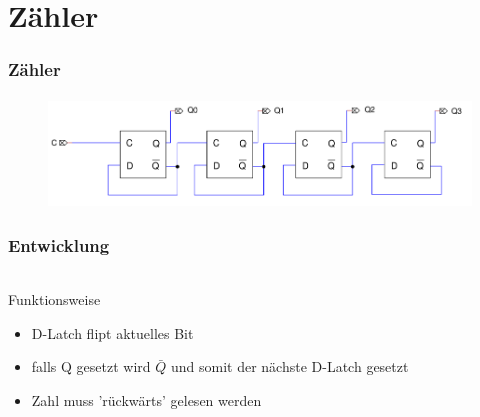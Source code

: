 \section{Zähler} %
\label{sec:Zähler}
\begin{frame}
    \frametitle{Zähler}
    \framesubtitle{}
     \begin{figure}[H]
     \begin{center}
             \includegraphics[scale=0.3]{./img/schaltung/zahler.png}
     \end{center}
     \end{figure}
\end{frame}
\begin{frame}
    \frametitle{Entwicklung}
    \framesubtitle{}
    \begin{columns}[c]
         \begin{block}{Funktionsweise}
            \begin{itemize}
                \item D-Latch flipt aktuelles Bit 
                \item falls Q gesetzt wird $\bar{Q}$ und somit der nächste D-Latch
                gesetzt
                \item Zahl muss 'rückwärts' gelesen werden
            \end{itemize}
         \end{block}
             \begin{center}
             \end{center}
    \end{columns}
\end{frame}

